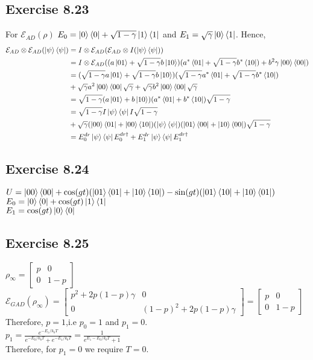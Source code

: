 \documentclass[a4paper,12pt]{article}
\begin{document}
\subsection*{Exercise 8.23}
For $\mathcal{E}_{AD}(\rho)$ $E_0=\ket{0}\bra{0}+\sqrt{1-\gamma}\ket{1}\bra{1}$ and
$E_1=\sqrt{\gamma}\ket{0}\bra{1}$. Hence,\\
\begin{align*}
    \mathcal{E}_{AD}\otimes\mathcal{E}_{AD}(\ket{\psi}\bra{\psi})&=
    I\otimes\mathcal{E}_{AD}(\mathcal{E}_{AD} \otimes I(\ket{\psi}\bra{\psi}))\\
    &=I\otimes\mathcal{E}_{AD}((a\ket{01}+\sqrt{1-\gamma}b\ket{10})(a^*\bra{01}+\sqrt{1-\gamma}b^*\bra{10})
    +b^2\gamma\ket{00}\bra{00})\\
    &=(\sqrt{1-\gamma}a\ket{01}+\sqrt{1-\gamma}b\ket{10})
    (\sqrt{1-\gamma}a^*\bra{01}+\sqrt{1-\gamma}b^*\bra{10})\\
    &+\sqrt{\gamma}a^2\ket{00}\bra{00}\sqrt{\gamma}+\sqrt{\gamma}b^2\ket{00}\bra{00}\sqrt{\gamma}\\
    &=\sqrt{1-\gamma}(a\ket{01}+b\ket{10})(a^*\bra{01}+b^*\bra{10})\sqrt{1-\gamma}\\
    &=\sqrt{1-\gamma}I\ket{\psi}\bra{\psi}I\sqrt{1-\gamma}\\
    &+\sqrt{\gamma}(\ket{00}\bra{01}+\ket{00}\bra{10})(\ket{\psi}\bra{\psi})
    (\ket{01}\bra{00}+\ket{10}\bra{00})\sqrt{1-\gamma}\\
    &=E_0^{dr}\ket{\psi}\bra{\psi}E_0^{dr\dagger}+E_1^{dr}\ket{\psi}\bra{\psi}E_1^{dr\dagger}
\end{align*}

\subsection*{Exercise 8.24}
$U=\ket{00}\bra{00}+\cos(gt)(\ket{01}\bra{01}+\ket{10}\bra{10})-
\sin(gt)(\ket{01}\bra{10}+\ket{10}\bra{01})$\\
$E_0=\ket{0}\bra{0}+\cos(gt)\ket{1}\bra{1}$\\
$E_1=\cos(gt)\ket{0}\bra{0}$
\subsection*{Exercise 8.25}
$\rho_\infty=
\begin{bmatrix}
    p&0\\
    0&1-p
\end{bmatrix}$\\
$\mathcal{E}_{GAD}(\rho_\infty)=
\begin{bmatrix}
    p^2+2p(1-p)\gamma&0\\
    0& (1-p)^2+2p(1-p)\gamma
\end{bmatrix}
=\begin{bmatrix}
    p&0\\
    0&1-p
\end{bmatrix}$\\
Therefore, $p=1$,i.e $p_0=1$ and $p_1=0$.\\
$p_1=\displaystyle \frac{e^{-E_1/k_bT}}{e^{-E_0/k_bT}+e^{-E_1/k_bT}}=
\displaystyle\frac{1}{e^{E_1-E_0/k_bT}+1}$\\
Therefore, for $p_1=0$ we require $T=0$.
\end{document}

